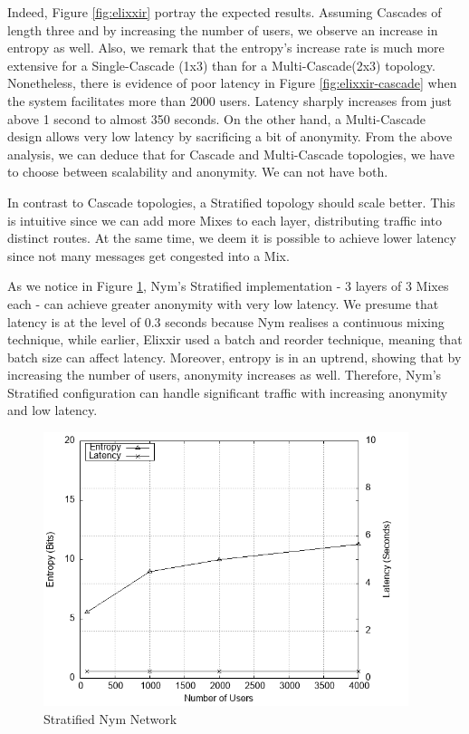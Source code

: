 \documentclass[logo,msc,cyber]{infthesis}   %
\begin{document}
 Indeed, Figure \ref{fig:elixxir} portray the expected results. Assuming
 Cascades of length three and by increasing the number of users, we observe an
 increase in entropy as well. Also, we remark that the entropy's increase rate
 is much more extensive for a Single-Cascade (1x3) than for a Multi-Cascade(2x3)
 topology. Nonetheless, there is evidence of poor latency in Figure
 \ref{fig:elixxir-cascade} when the system facilitates more than 2000 users.
 Latency sharply increases from just above 1 second to almost 350 seconds. On
 the other hand, a Multi-Cascade design allows very low latency by sacrificing a
 bit of anonymity. From the above analysis, we can deduce that for Cascade and
 Multi-Cascade topologies, we have to choose between scalability and anonymity.
 We can not have both.

 In contrast to Cascade topologies, a Stratified topology should scale better.
 This is intuitive since we can add more Mixes to each layer, distributing
 traffic into distinct routes. At the same time, we deem it is possible to
 achieve lower latency since not many messages get congested into a Mix. 

 As we notice in Figure \ref{fig:nym-stratified}, Nym's Stratified
 implementation - 3 layers of 3 Mixes each - can achieve greater anonymity with
 very low latency. We presume that latency is at the level of 0.3 seconds
 because Nym realises a continuous mixing technique, while earlier, Elixxir used
 a batch and reorder technique, meaning that batch size can affect latency.
 Moreover, entropy is in an uptrend, showing that by increasing the number of
 users, anonymity increases as well. Therefore, Nym's Stratified configuration
 can handle significant traffic with increasing anonymity and low latency.

\begin{figure}[h!]
    \centering
    \includegraphics[height=8cm]{figures/simulator/2.png}
    \caption{Stratified Nym Network}
    \label{fig:nym-stratified}
 \end{figure}
\end{document}

